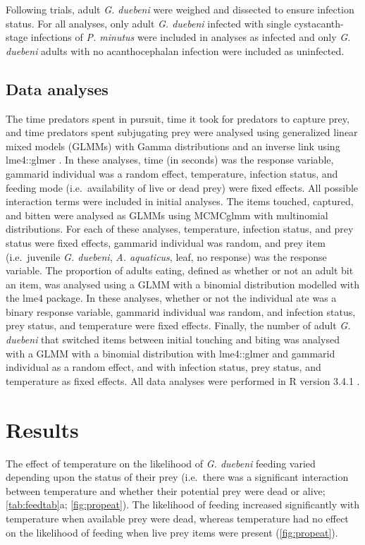 Following trials, adult \emph{G. duebeni} were weighed and dissected to ensure infection status. For all analyses, only adult \emph{G. duebeni} infected with single cystacanth-stage infections of \emph{P. minutus} were included in analyses as infected and only \emph{G. duebeni} adults with no acanthocephalan infection were included as uninfected. 

\subsection{Data analyses}

The time predators spent in pursuit, time it took for predators to capture prey, and time predators spent subjugating prey were analysed using generalized linear mixed models (GLMMs) with Gamma distributions and an inverse link using lme4::glmer \citep{bates2015}. In these analyses, time (in seconds) was the response variable, gammarid individual was a random effect, temperature, infection status, and feeding mode (i.e.\ availability of live or dead prey) were fixed effects. All possible interaction terms were included in initial analyses. The items touched, captured, and bitten were analysed as GLMMs using MCMCglmm \citep{hadfield2010} with multinomial distributions. For each of these analyses, temperature, infection status, and prey status were fixed effects, gammarid individual was random, and prey item (i.e.\ juvenile \emph{G. duebeni}, \emph{A. aquaticus}, leaf, no response) was the response variable. The proportion of adults eating, defined as whether or not an adult bit an item, was analysed using a GLMM with a binomial distribution modelled with the lme4 package. In these analyses, whether or not the individual ate was a binary response variable, gammarid individual was random, and infection status, prey status, and temperature were fixed effects. Finally, the number of adult \emph{G. duebeni} that switched items between initial touching and biting was analysed with a GLMM with a binomial distribution with lme4::glmer and gammarid individual as a random effect, and with infection status, prey status, and temperature as fixed effects. All data analyses were performed in R version 3.4.1 \cite{r2017}.

\section{Results}

The effect of temperature on the likelihood of \emph{G. duebeni} feeding varied depending upon the status of their prey (i.e.\ there was a significant interaction between temperature and whether their potential prey were dead or alive;\ref{tab:feedtab}a; \ref{fig:propeat}). The likelihood of feeding increased significantly with temperature when available prey were dead, whereas temperature had no effect on the likelihood of feeding when live prey items were present (\ref{fig:propeat}). 

